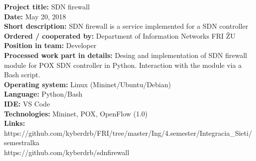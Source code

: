 \documentclass{article}
\begin{document}
\noindent
\textbf{Project title:} SDN firewall\\
\textbf{Date:} May 20, 2018\\
\textbf{Short description:} SDN firewall is a service implemented for a SDN controller\\
\textbf{Ordered / cooperated by:} Department of Information Networks FRI ŽU\\
\textbf{Position in team:} Developer\\
\textbf{Processed work part in details:} Desing and implementation of SDN firewall module for POX SDN controller in Python. Interaction with the module via a Bash script.\\
\textbf{Operating system:} Linux (Mininet/Ubuntu/Debian)\\
\textbf{Language:} Python/Bash\\
\textbf{IDE:} VS Code\\
\textbf{Technologies:} Mininet, POX, OpenFlow (1.0)\\
\textbf{Links:}\\
https://github.com/kyberdrb/FRI/tree/master/Ing/4.semester/Integracia\_Sieti/semestralka\\
https://github.com/kyberdrb/sdnfirewall
\end{document}
